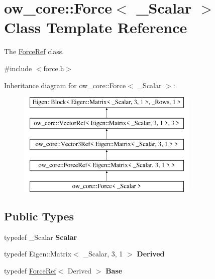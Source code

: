 \hypertarget{classow__core_1_1Force}{}\section{ow\+\_\+core\+:\+:Force$<$ \+\_\+\+Scalar $>$ Class Template Reference}
\label{classow__core_1_1Force}


The \hyperlink{classow__core_1_1ForceRef}{Force\+Ref} class.  




{\ttfamily \#include $<$force.\+h$>$}

Inheritance diagram for ow\+\_\+core\+:\+:Force$<$ \+\_\+\+Scalar $>$\+:\begin{figure}[H]
\begin{center}
\leavevmode
\includegraphics[height=5.000000cm]{d5/d29/classow__core_1_1Force}
\end{center}
\end{figure}
\subsection*{Public Types}
\begin{DoxyCompactItemize}
\item 
typedef \+\_\+\+Scalar {\bfseries Scalar}\hypertarget{classow__core_1_1Force_a551a42903f5645dd058650d0205586bf}{}\label{classow__core_1_1Force_a551a42903f5645dd058650d0205586bf}

\item 
typedef Eigen\+::\+Matrix$<$ \+\_\+\+Scalar, 3, 1 $>$ {\bfseries Derived}\hypertarget{classow__core_1_1Force_a2b611f8d302b86c6dcb045e9d3b24b75}{}\label{classow__core_1_1Force_a2b611f8d302b86c6dcb045e9d3b24b75}

\item 
typedef \hyperlink{classow__core_1_1ForceRef}{Force\+Ref}$<$ Derived $>$ {\bfseries Base}\hypertarget{classow__core_1_1Force_a3d10d556af18cc56227ddca163044d0c}{}\label{classow__core_1_1Force_a3d10d556af18cc56227ddca163044d0c}

\end{DoxyCompactItemize}
